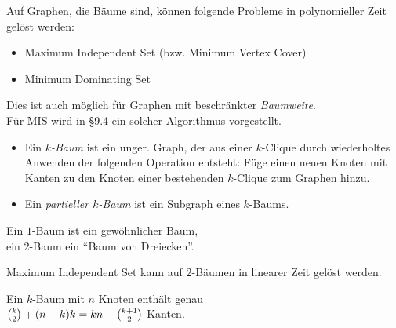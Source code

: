 \documentclass{cheat-sheet}
\begin{document}
\begin{motivation}
  Auf Graphen, die Bäume sind, können folgende Probleme in polynomieller Zeit gelöst werden:
  \begin{itemize}
    \item Maximum Independent Set (bzw. Minimum Vertex Cover)
    \item Minimum Dominating Set
  \end{itemize}
  Dies ist auch möglich für Graphen mit beschränkter \textit{Baumweite}. \\
  Für MIS wird in §9.4 ein solcher Algorithmus vorgestellt.
\end{motivation}

\begin{defn}
  \begin{itemize}
    \item
      Ein \emph{$k$-Baum} ist ein unger. Graph, der aus einer $k$-Clique durch wiederholtes Anwenden der folgenden Operation entsteht:
      Füge einen neuen Knoten mit Kanten zu den Knoten einer bestehenden $k$-Clique zum Graphen hinzu.
    \item Ein \emph{partieller $k$-Baum} ist ein Subgraph eines $k$-Baums.
  \end{itemize}
\end{defn}

\begin{bspe}
  \begin{minipage}[t]{0.8 \linewidth}
    Ein $1$-Baum ist ein gewöhnlicher Baum, \\
    ein $2$-Baum ein "`Baum von Dreiecken"'.
  \end{minipage}
\end{bspe}

\begin{lem}
  Maximum Independent Set kann auf $2$-Bäumen in linearer Zeit gelöst werden.
\end{lem}

\begin{lem}
  \begin{minipage}[t]{0.8 \linewidth}
    Ein $k$-Baum mit $n$ Knoten enthält genau \\
    $\tbinom{k}{2} + (n-k) k = k n - \tbinom{k+1}{2}$ Kanten.
  \end{minipage}
\end{lem}
\end{document}
